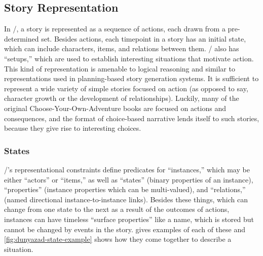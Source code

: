 \subsection{Story Representation}


In \dunyazad/, a story is represented as a sequence of actions, each drawn from a pre-determined set.
%
Besides actions, each timepoint in a story has an initial state, which can include characters, items, and relations between them.
%
\dunyazad/ also has ``setups,'' which are used to establish interesting situations that motivate action.
%
This kind of representation is amenable to logical reasoning and similar to representations used in planning-based story generation systems.
%
It is sufficient to represent a wide variety of simple stories focused on action (as opposed to say, character growth or the development of relationships).
%
Luckily, many of the original Choose-Your-Own-Adventure books are focused on actions and consequences, and the format of choice-based narrative lends itself to such stories, because they give rise to interesting choices.


\subsubsection{States}

\dunyazad/'s representational constraints define predicates for ``instances,'' which may be either ``actors'' or ``items,'' as well as ``states'' (binary properties of an instance), ``properties'' (instance properties which can be multi-valued), and ``relations,'' (named directional instance-to-instance links).
%
Besides these things, which can change from one state to the next as a result of the outcomes of actions, instances can have timeless ``surface properties'' like a name, which is stored but cannot be changed by events in the story.
%
 gives examples of each of these and \cref{fig:dunyazad-state-example} shows how they come together to describe a situation.


